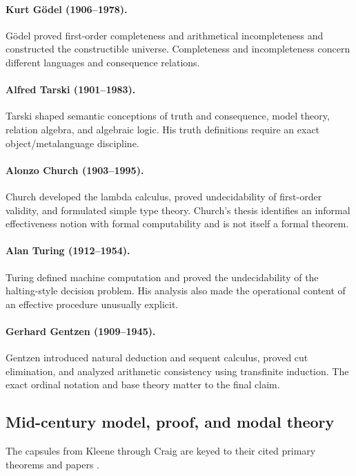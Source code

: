 \paragraph{Kurt G\"odel (1906--1978).}
G\"odel proved first-order completeness and arithmetical incompleteness and
constructed the constructible universe. Completeness and incompleteness concern
different languages and consequence relations.

\paragraph{Alfred Tarski (1901--1983).}
Tarski shaped semantic conceptions of truth and consequence, model theory,
relation algebra, and algebraic logic. His truth definitions require an exact
object/metalanguage discipline.

\paragraph{Alonzo Church (1903--1995).}
Church developed the lambda calculus, proved undecidability of first-order
validity, and formulated simple type theory. Church's thesis identifies an
informal effectiveness notion with formal computability and is not itself a
formal theorem.

\paragraph{Alan Turing (1912--1954).}
Turing defined machine computation and proved the undecidability of the
halting-style decision problem. His analysis also made the operational content
of an effective procedure unusually explicit.

\paragraph{Gerhard Gentzen (1909--1945).}
Gentzen introduced natural deduction and sequent calculus, proved cut
elimination, and analyzed arithmetic consistency using transfinite induction.
The exact ordinal notation and base theory matter to the final claim.

\subsection*{Mid-century model, proof, and modal theory}
The capsules from Kleene through Craig are keyed to their cited primary
theorems and papers \cite{Kleene1952,Henkin1949,Henkin1950,Post1944,Robinson1965,
Kripke1963,Kripke1965,Kripke1975,Beth1953,Craig1957}.

